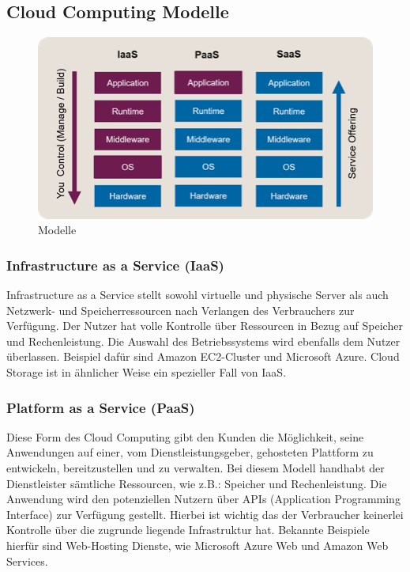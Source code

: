 \subsection{Cloud Computing Modelle}

\begin{figure}[h]
    \centering
    \includegraphics[scale=0.9]{sections/cloud-computing/images/models.png}
    \caption{Modelle}
\end{figure}

\subsubsection{Infrastructure as a Service (IaaS)}

Infrastructure as a Service stellt sowohl virtuelle und physische Server als auch Netzwerk- und Speicherressourcen nach Verlangen des Verbrauchers zur Verfügung. Der Nutzer hat volle Kontrolle über Ressourcen in Bezug auf Speicher und Rechenleistung. Die Auswahl des Betriebssystems wird ebenfalls dem Nutzer überlassen. Beispiel dafür sind Amazon EC2-Cluster und Microsoft Azure. Cloud Storage ist in ähnlicher Weise ein spezieller Fall von IaaS.

\subsubsection{Platform as a Service (PaaS)}

Diese Form des Cloud Computing gibt den Kunden die Möglichkeit, seine Anwendungen auf einer, vom Dienstleistungsgeber, gehosteten Plattform zu entwickeln, bereitzustellen und zu verwalten. Bei diesem Modell handhabt der Dienstleister sämtliche Ressourcen, wie z.B.: Speicher und Rechenleistung. Die Anwendung wird den potenziellen Nutzern über APIs (Application Programming Interface) zur Verfügung gestellt. Hierbei ist wichtig das der Verbraucher keinerlei Kontrolle über die zugrunde liegende Infrastruktur hat. Bekannte Beispiele hierfür sind Web-Hosting Dienste, wie Microsoft Azure Web und Amazon Web Services.

